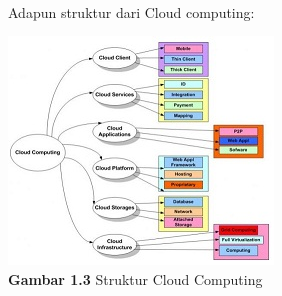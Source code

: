 \\Adapun struktur dari Cloud computing:
\begin{center}
\includegraphics[scale=1]{stiga.jpg} \\
\textbf{Gambar 1.3} Struktur Cloud Computing
\end{center}
